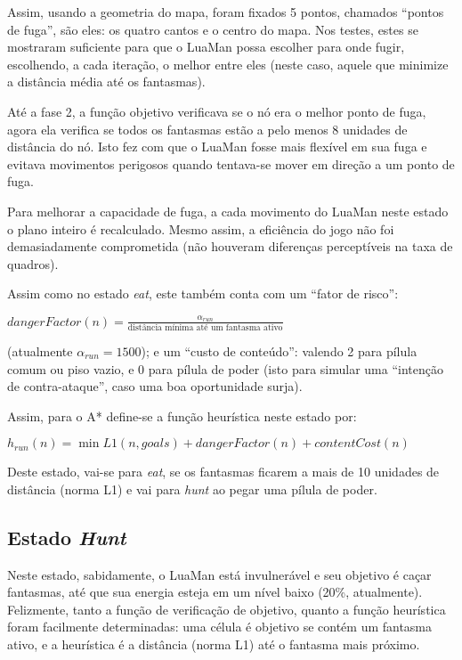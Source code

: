 \documentclass[a4paper]{scrartcl}
\begin{document}
Assim, usando a geometria do mapa, foram fixados 5 pontos, chamados ``pontos de fuga'', são eles:
os quatro cantos e o centro do mapa. Nos testes, estes se mostraram suficiente para que o LuaMan
possa escolher para onde fugir, escolhendo, a cada iteração, o melhor entre eles (neste caso, aquele
que minimize a distância média até os fantasmas).

Até a fase 2, a função objetivo verificava se o nó era o melhor ponto de fuga, agora ela verifica se todos os fantasmas estão a pelo menos 8
unidades de distância do nó. Isto fez com que o LuaMan fosse mais flexível em sua fuga e evitava movimentos perigosos quando tentava-se mover
em direção a um ponto de fuga.

Para melhorar a capacidade de fuga, a cada movimento do LuaMan neste estado o plano inteiro é recalculado.
 Mesmo assim, a eficiência do jogo não foi demasiadamente comprometida (não houveram
diferenças perceptíveis na taxa de quadros).

Assim como no estado \textit{eat}, este também conta com um ``fator de risco'':

$dangerFactor(n) =  \frac{\alpha_{run}}{\text{distância mínima até um fantasma ativo}}$

(atualmente $\alpha_{run} = 1500$); e um ``custo de conteúdo'': valendo 2 para pílula comum ou piso vazio, e 0 para pílula de poder (isto para simular uma ``intenção de contra-ataque'', caso uma boa oportunidade surja).

Assim, para o A* define-se a função heurística neste estado por:

$h_{run}(n) = \min{L1(n, goals)} + dangerFactor(n) + contentCost(n)$

Deste estado, vai-se para \textit{eat}, se os fantasmas ficarem a mais de 10 unidades de distância (norma L1) e vai para \textit{hunt} ao pegar uma pílula de poder.

\subsection{Estado \textit{Hunt}}

Neste estado, sabidamente, o LuaMan está invulnerável e seu objetivo é caçar fantasmas, até que sua
energia esteja em um nível baixo (20\%, atualmente). Felizmente, tanto a função de verificação
de objetivo, quanto a função heurística foram facilmente determinadas:
uma célula é objetivo se contém um fantasma ativo, e a heurística é a distância (norma L1) até o fantasma mais próximo.
\end{document}
